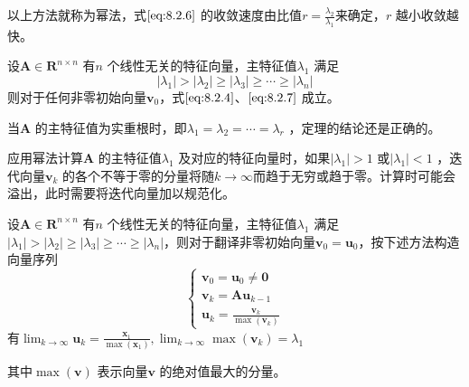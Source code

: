 \documentclass[a4paper]{article}
\begin{document}
以上方法就称为幂法，式$\ref{eq:8.2.6}$ 的收敛速度由比值$r = \frac{\lambda_2}{\lambda_1}$来确定，$r$ 越小收敛越快。

\begin{theorem}
	设$\mathbf{A} \in \mathbf{R}^{n \times n}$ 有$n$ 个线性无关的特征向量，主特征值$\lambda_1$ 满足
	\[
		| \lambda_1 | > | \lambda_2 | \ge | \lambda_3 | \ge \cdots \ge | \lambda_n | \tag{8.2.1} \label{eq:8.2.1} 	
	\] 
	则对于任何非零初始向量$\mathbf{v}_0$，式$\ref{eq:8.2.4}$、$\ref{eq:8.2.7}$ 成立。
\end{theorem}

当$\mathbf{A}$ 的主特征值为实重根时，即$\lambda_1 = \lambda_2 = \cdots = \lambda_r$ ，定理的结论还是正确的。

应用幂法计算$\mathbf{A}$ 的主特征值$\lambda_1$ 及对应的特征向量时，如果$|\lambda_1| > 1$ 或$|\lambda_1|<1$ ，迭代向量$\mathbf{v}_k$ 的各个不等于零的分量将随$k \to \infty$而趋于无穷或趋于零。计算时可能会溢出，此时需要将迭代向量加以规范化。

\begin{thoerem}
设$\mathbf{A} \in \mathbf{R}^{n \times n}$ 有$n$ 个线性无关的特征向量，主特征值$\lambda_1$ 满足$|\lambda_1 | > |\lambda_2| \ge |\lambda_3| \ge \cdots \ge |\lambda_n|$，则对于翻译非零初始向量$\mathbf{v}_0 = \mathbf{u}_0$，按下述方法构造向量序列
\[
\tag{8.2.9} \label{eq:8.2.9} 
\begin{cases}
	\mathbf{v}_0 = \mathbf{u}_0 \neq \mathbf{0} \\
	\mathbf{v}_k = \mathbf{A u}_{k-1} \\
	\mathbf{u}_k = \frac{\mathbf{v}_k}{\max(\mathbf{v}_k)}
\end{cases} 
\] 
有$\lim_{k \to \infty} \mathbf{u}_k = \frac{\mathbf{x}_1}{\max (\mathbf{x}_1)}, \lim_{k \to \infty} \max(\mathbf{v}_k) = \lambda_1$
\end{thoerem}
其中$\max(\mathbf{v})$ 表示向量$\mathbf{v}$ 的绝对值最大的分量。
\end{document}
